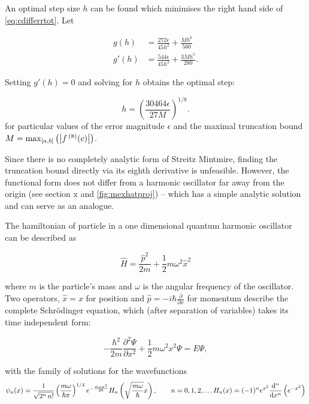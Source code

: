 An optimal step size $h$ can be found which minimises the right hand side of \cref{eq:cdifferrtot}. Let

\begin{align}
g(h) &= \frac{272\epsilon}{45h^2}+\frac{Mh^6}{560}\\[0.2cm]
g'(h) &= \frac{544\epsilon}{45h^3}+\frac{3Mh^5}{280}.
\end{align}

Setting $g'(h) = 0$ and solving for $h$ obtains the optimal step:

\begin{equation}
h = \left(\frac{30464\epsilon}{27M}\right)^{1/8}.\label{eq:stepgen}
\end{equation}
for particular values of the error magnitude $\epsilon$ and the maximal truncation bound $M = \mathrm{max}_{[a,b]}\left(\left\lvert f\,^{(8)}(c)\right\rvert\right)$.

Since there is no completely analytic form of Streitz Mintmire, finding the truncation bound directly via its eighth derivative is unfeasible.
However, the functional form does not differ from a harmonic oscillator far away from the origin (see section x and \cref{fig:mexhatproj}) -- which has a simple analytic solution and can serve as an analogue.

The hamiltonian of particle in a one dimensional quantum harmonic oscillator can be described as

\begin{equation}
\widehat{H} = \frac{\widehat{p}^2}{2m}+\frac{1}{2}m\omega^2\widehat{x}^2\label{eq:hamho}
\end{equation}

where $m$ is the particle's mass and $ω$ is the angular frequency of the oscillator.
Two operators, $\widehat{x} = x$ for position and $\widehat{p} = -i\hbar \frac{\partial}{\partial x}$ for momentum describe the complete Schr\"{o}dinger equation, which (after separation of variables) takes its time independent form:

\begin{equation}
-\frac{\hbar^2}{2m}\frac{\partial^2 \Psi}{\partial x^2}+\frac{1}{2}m\omega^2x^2 \Psi = E\Psi,
\label{eq:hamti}
\end{equation}

with the family of solutions for the wavefunctions
\begin{equation}\psi_n(x) = \frac{1}{\sqrt{2^n\,n!}}\left(\frac{m\omega}{\hbar\pi}\right)^{1/4}e^{
- \frac{m\omega x^2}{2 \hbar}} H_n\left(\sqrt{\frac{m\omega}{\hbar}} x \right),\qquad n = 0,1,2,\ldots\\
H_n(x)=(-1)^n e^{x^2}\frac{\mathrm{d}^n}{\mathrm{d}x^n}\left(e^{-x^2}\right)
\end{equation}

